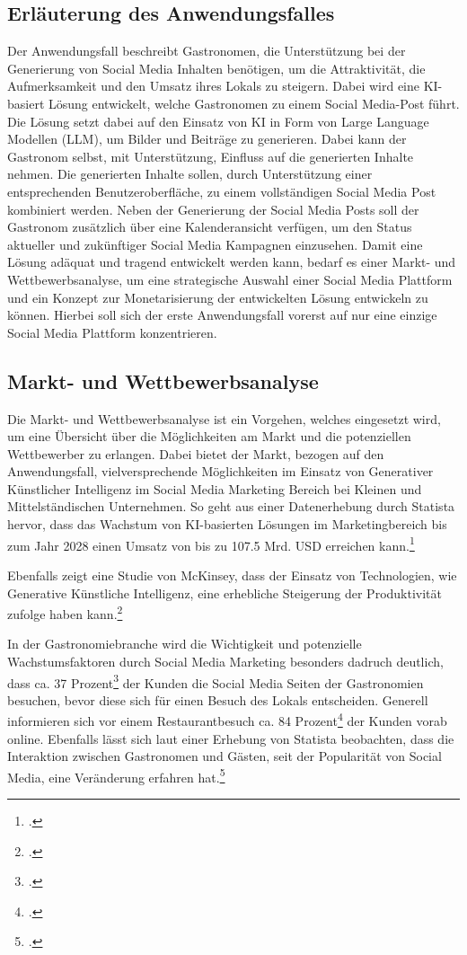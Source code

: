 \subsection{Erläuterung des Anwendungsfalles}
Der Anwendungsfall beschreibt Gastronomen, die Unterstützung bei der Generierung von Social Media Inhalten benötigen, um die Attraktivität, die Aufmerksamkeit und den Umsatz ihres Lokals zu steigern.
Dabei wird eine KI-basiert Lösung entwickelt, welche Gastronomen zu einem Social Media-Post führt.
Die Lösung setzt dabei auf den Einsatz von KI in Form von Large Language Modellen (LLM), um Bilder und Beiträge zu generieren.
Dabei kann der Gastronom selbst, mit Unterstützung, Einfluss auf die generierten Inhalte nehmen.
Die generierten Inhalte sollen, durch Unterstützung einer entsprechenden Benutzeroberfläche, zu einem vollständigen Social Media Post kombiniert werden.
Neben der Generierung der Social Media Posts soll der Gastronom zusätzlich über eine Kalenderansicht verfügen, um den Status aktueller und zukünftiger Social Media Kampagnen einzusehen.
Damit eine Lösung adäquat und tragend entwickelt werden kann, bedarf es einer Markt- und Wettbewerbsanalyse, um eine strategische Auswahl einer Social Media Plattform und ein Konzept zur Monetarisierung der entwickelten Lösung entwickeln zu können.
Hierbei soll sich der erste Anwendungsfall vorerst auf nur eine einzige Social Media Plattform konzentrieren.

\subsection{Markt- und Wettbewerbsanalyse}
Die Markt- und Wettbewerbsanalyse ist ein Vorgehen, welches eingesetzt wird, um eine Übersicht über die Möglichkeiten am Markt und die potenziellen Wettbewerber zu erlangen.
Dabei bietet der Markt, bezogen auf den Anwendungsfall, vielversprechende Möglichkeiten im Einsatz von Generativer Künstlicher Intelligenz im Social Media Marketing Bereich bei Kleinen und Mittelständischen Unternehmen.
So geht aus einer Datenerhebung durch Statista hervor, dass das Wachstum von KI-basierten Lösungen im Marketingbereich bis zum Jahr 2028 einen Umsatz von bis zu 107.5 Mrd. USD erreichen kann.\footcite{statista_ai_marketing_europe}

Ebenfalls zeigt eine Studie von McKinsey, dass der Einsatz von Technologien, wie Generative Künstliche Intelligenz, eine erhebliche Steigerung der Produktivität zufolge haben kann.\footcite{mckinsey_genai_marketing}

In der Gastronomiebranche wird die Wichtigkeit und potenzielle Wachstumsfaktoren durch Social Media Marketing besonders dadruch deutlich, dass ca. 37 Prozent\footcite{apicbase_gastro_fakten} der Kunden die Social Media Seiten der Gastronomien besuchen, bevor diese sich für einen Besuch des Lokals entscheiden.
Generell informieren sich vor einem Restaurantbesuch ca. 84 Prozent\footcite{g_wie_gastro_trends_2024} der Kunden vorab online.
Ebenfalls lässt sich laut einer Erhebung von Statista beobachten, dass die Interaktion zwischen Gastronomen und Gästen, seit der Popularität von Social Media, eine Veränderung erfahren hat.\footcite{statista_social_media_gastgewerbe}

